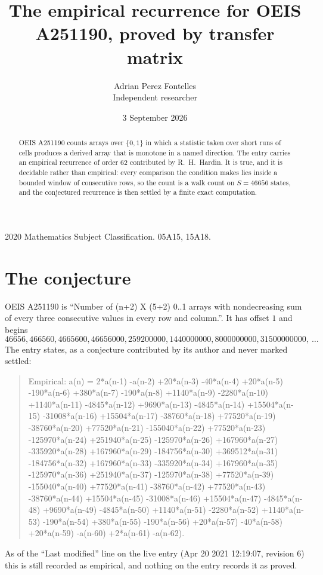 \documentclass[11pt,a4paper]{article}
\title{The empirical recurrence for OEIS A251190, proved by transfer matrix}
\author{Adrian Perez Fontelles\\ \small Independent researcher}
\date{3 September 2026}
\theoremstyle{plain}
\theoremstyle{definition}
\begin{document}
\maketitle

\begin{abstract}
OEIS A251190 counts arrays over $\{0,1\}$ in which a statistic taken over short runs
of cells produces a derived array that is monotone in a named direction. The entry carries an
empirical recurrence of order $62$ contributed by R.~H.~Hardin. It is true, and it is
decidable rather than empirical: every comparison the condition makes lies inside a bounded
window of consecutive rows, so the count is a walk count on $S=46656$ states, and the
conjectured recurrence is then settled by a finite exact computation.
\end{abstract}

\noindent\small 2020 Mathematics Subject Classification. 05A15, 15A18.\normalsize

\section{The conjecture}

OEIS A251190 is ``Number of (n+2) X (5+2) 0..1 arrays with nondecreasing sum of every three consecutive values in every row and column.''. It has offset $1$ and begins
\[
46656, 466560, 4665600, 46656000, 259200000, 1440000000, 8000000000, 31500000000,\ \dots
\]
The entry states, as a conjecture contributed by its author and never marked settled:
\begin{quote}
Empirical: a(n) = 2*a(n-1) -a(n-2) +20*a(n-3) -40*a(n-4) +20*a(n-5) -190*a(n-6) +380*a(n-7) -190*a(n-8) +1140*a(n-9) -2280*a(n-10) +1140*a(n-11) -4845*a(n-12) +9690*a(n-13) -4845*a(n-14) +15504*a(n-15) -31008*a(n-16) +15504*a(n-17) -38760*a(n-18) +77520*a(n-19) -38760*a(n-20) +77520*a(n-21) -155040*a(n-22) +77520*a(n-23) -125970*a(n-24) +251940*a(n-25) -125970*a(n-26) +167960*a(n-27) -335920*a(n-28) +167960*a(n-29) -184756*a(n-30) +369512*a(n-31) -184756*a(n-32) +167960*a(n-33) -335920*a(n-34) +167960*a(n-35) -125970*a(n-36) +251940*a(n-37) -125970*a(n-38) +77520*a(n-39) -155040*a(n-40) +77520*a(n-41) -38760*a(n-42) +77520*a(n-43) -38760*a(n-44) +15504*a(n-45) -31008*a(n-46) +15504*a(n-47) -4845*a(n-48) +9690*a(n-49) -4845*a(n-50) +1140*a(n-51) -2280*a(n-52) +1140*a(n-53) -190*a(n-54) +380*a(n-55) -190*a(n-56) +20*a(n-57) -40*a(n-58) +20*a(n-59) -a(n-60) +2*a(n-61) -a(n-62).
\end{quote}
As of the ``Last modified'' line on the live entry (Apr 20 2021 12:19:07, revision 6) this is still
recorded as empirical, and nothing on the entry records it as proved.
\end{document}
